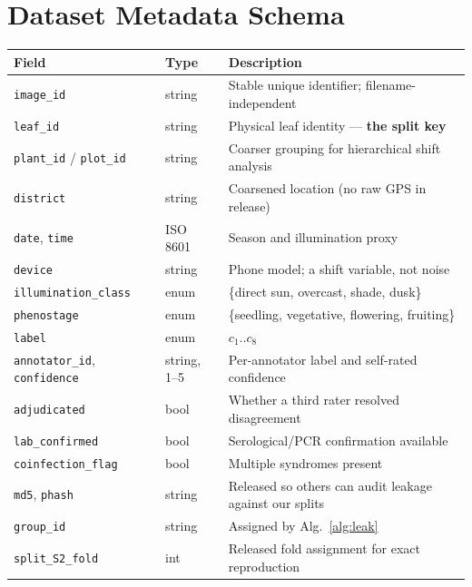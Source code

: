 \documentclass[10pt,twocolumn,a4paper]{article}
\begin{document}
\section{Dataset Metadata Schema}
\label{app:schema}
\vspace{-2pt}
{\footnotesize
\begin{tabularx}{\textwidth}{@{}p{3.0cm} p{2.2cm} X@{}}
\toprule
\rowcolor{hdrgray}
Field & Type & Description \\
\midrule
\texttt{image\_id} & string & Stable unique identifier; filename-independent \\
\texttt{leaf\_id} & string & Physical leaf identity --- \textbf{the split key} \\
\texttt{plant\_id} / \texttt{plot\_id} & string & Coarser grouping for hierarchical shift analysis \\
\texttt{district} & string & Coarsened location (no raw GPS in release) \\
\texttt{date}, \texttt{time} & ISO 8601 & Season and illumination proxy \\
\texttt{device} & string & Phone model; a shift variable, not noise \\
\texttt{illumination\_class} & enum & \{direct sun, overcast, shade, dusk\} \\
\texttt{phenostage} & enum & \{seedling, vegetative, flowering, fruiting\} \\
\texttt{label} & enum & $c_1..c_8$ \\
\texttt{annotator\_id}, \texttt{confidence} & string, 1--5 & Per-annotator label and self-rated confidence \\
\texttt{adjudicated} & bool & Whether a third rater resolved disagreement \\
\texttt{lab\_confirmed} & bool & Serological/PCR confirmation available \\
\texttt{coinfection\_flag} & bool & Multiple syndromes present \\
\texttt{md5}, \texttt{phash} & string & Released so others can audit leakage against our splits \\
\texttt{group\_id} & string & Assigned by Alg.~\ref{alg:leak} \\
\texttt{split\_S2\_fold} & int & Released fold assignment for exact reproduction \\
\bottomrule
\end{tabularx}}

\end{document}
